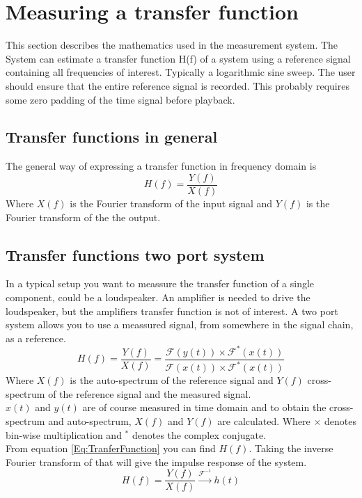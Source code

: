 \section{Measuring a transfer function}
This section describes the mathematics used in the measurement system. The System can estimate a transfer function H(f) of a system using a reference signal containing all frequencies of interest. Typically  a logarithmic sine sweep. The user should ensure that the entire reference signal is recorded. This probably requires some zero padding of the time signal before playback.
\subsection{Transfer functions in general}
The general way of expressing a transfer function in frequency domain is
\begin{equation}
H(f)=\frac{Y(f)}{X(f)}
\label{Eq:TranferFunction}
\end{equation}
Where $X(f)$ is the Fourier transform of the input signal and $Y(f)$ is the Fourier transform of the the output.  

\subsection{Transfer functions two port system}
In a typical setup you want to meassure the transfer function of a single component, could be a loudspeaker. An amplifier is needed to drive the loudspeaker, but the amplifiers transfer function is not of interest. A two port system allows you to use a meassured signal, from somewhere in the signal chain, as a reference. 
\begin{equation}
H(f)=\frac{Y(f)}{X(f)}=\frac{\mathscr{F}(y(t))\times\mathscr{F}^{\ast}(x(t))}{\mathscr{F}(x(t))\times\mathscr{F}^{\ast}(x(t))}
\label{Eq:TranferFunctionTwoPort}
\end{equation}
Where $X(f)$ is the auto-spectrum of the reference signal and $Y(f)$ cross-spectrum of the reference signal and the measured signal.\\
$x(t)$ and $y(t)$ are of course measured in time domain and to obtain the cross-spectrum and auto-spectrum, $X(f)$ and $Y(f)$ are calculated.
Where $\times$ denotes bin-wise multiplication and $^{\ast}$ denotes the complex conjugate. \\
From equation \ref{Eq:TranferFunction} %
you can find $H(f)$. Taking the inverse Fourier transform of that will give the impulse response of the system. 
\begin{equation}
H(f) = \frac{Y(f)}{X(f)} \xrightarrow{\mathscr{F}^{-1}} h(t)
\label{Eq:Impulseresponse}
\end{equation} 

